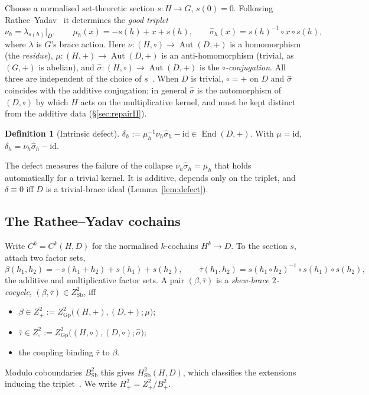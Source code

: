 \documentclass[11pt,reqno]{amsart}
\theoremstyle{plain}
\theoremstyle{definition}
\newtheorem{definition}[theorem]{Definition}
\newcommand{\Sb}{\mathrm{Sb}}
\newcommand{\Gp}{\mathrm{Gp}}
\newcommand{\id}{\mathrm{id}}
\newcommand{\Aut}{\operatorname{Aut}}
\newcommand{\End}{\operatorname{End}}
\newcommand{\shat}{\widehat{\sigma}}
\begin{document}
Choose a normalised set-theoretic section $s\colon H\to G$, $s(0)=0$. Following
Rathee--Yadav~\cite[\S2]{RY} it determines the \emph{good triplet}
\begin{equation}\label{eq:triplet}
\nu_h=\lambda_{s(h)}|_D,\qquad \mu_h(x)=-s(h)+x+s(h),\qquad \shat_h(x)=s(h)^{-1}\circ x\circ s(h),
\end{equation}
where $\lambda$ is $G$'s brace action. Here $\nu\colon(H,\circ)\to\Aut(D,+)$ is a
homomorphism (the \emph{residue}), $\mu\colon(H,+)\to\Aut(D,+)$ is an anti-homomorphism
(trivial, as $(G,+)$ is abelian), and $\shat\colon(H,\circ)\to\Aut(D,+)$ is the
\emph{$\circ$-conjugation}. All three are independent of the choice of $s$~\cite[\S2]{RY}.
When $D$ is trivial, $\circ=+$ on $D$ and $\shat$ coincides with the additive conjugation;
in general $\shat$ is the automorphism of $(D,\circ)$ by which $H$ acts on the
multiplicative kernel, and must be kept distinct from the additive data
(\S\ref{sec:repairII}).

\begin{definition}[Intrinsic defect]\label{def:defect}
$\delta_h:=\mu_h^{-1}\nu_h\shat_h-\id\in\End(D,+)$. With $\mu=\id$,
$\delta_h=\nu_h\shat_h-\id$.
\end{definition}

The defect measures the failure of the collapse $\nu_h\shat_h=\mu_h$ that holds
automatically for a trivial kernel. It is additive, depends only on the triplet, and
$\delta\equiv0$ iff $D$ is a trivial-brace ideal (Lemma~\ref{lem:defect}).

\subsection{The Rathee--Yadav cochains}
Write $C^k=C^k(H,D)$ for the normalised $k$-cochains $H^k\to D$. To the section $s$,
\cite{RY} attach two factor sets,
\begin{equation}\label{eq:factorsets}
\beta(h_1,h_2)=-s(h_1{+}h_2)+s(h_1)+s(h_2),\qquad
\bar\tau(h_1,h_2)=s(h_1\circ h_2)^{-1}\circ s(h_1)\circ s(h_2),
\end{equation}
the additive and multiplicative factor sets. A pair $(\beta,\bar\tau)$ is a
\emph{skew-brace $2$-cocycle}, $(\beta,\bar\tau)\in Z^2_{\Sb}$, iff
\begin{itemize}\itemsep1pt
\item[(a)] $\beta\in Z^2_+:=Z^2_{\Gp}\big((H,+),(D,+);\mu\big)$;
\item[(b)] $\bar\tau\in Z^2_\circ:=Z^2_{\Gp}\big((H,\circ),(D,\circ);\shat\big)$;
\item[(c)] the coupling \cite[(3.10)]{RY} binding $\bar\tau$ to $\beta$.
\end{itemize}
Modulo coboundaries $B^2_{\Sb}$ this gives $H^2_{\Sb}(H,D)$, which classifies the
extensions inducing the triplet~\cite[\S3]{RY}. We write $H^2_+=Z^2_+/B^2_+$.
\end{document}
